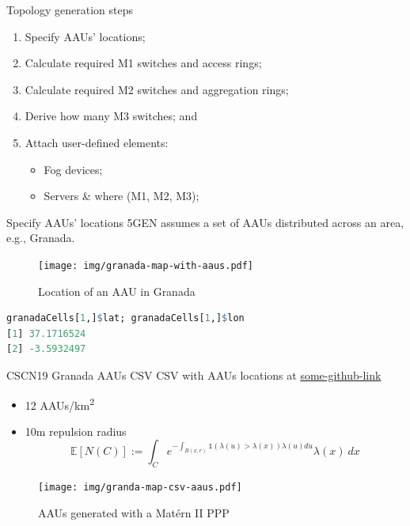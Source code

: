 \documentclass{beamer}
\begin{document}
\begin{frame}{Topology generation steps}
    \begin{enumerate}
        \item Specify AAUs' locations;
        \item Calculate required M1 switches and access rings;
        \item Calculate required M2 switches and aggregation rings;
        \item Derive how many M3 switches; and
        \item Attach user-defined elements:
            \begin{itemize}
                \item Fog devices;
                \item Servers \& where (M1, M2, M3);
            \end{itemize}
    \end{enumerate}
\end{frame}


\begin{frame}[fragile]{Specify AAUs' locations}
    5GEN assumes a set of AAUs distributed across an area, e.g., Granada.

    \begin{figure}
        \texttt{[image: img/granada-map-with-aaus.pdf]}
        \caption{Location of an AAU in Granada}
    \end{figure}


    \begin{lstlisting}[language=R]
granadaCells[1,]$lat; granadaCells[1,]$lon
[1] 37.1716524
[2] -3.5932497\end{lstlisting}
\end{frame}



\begin{frame}{CSCN19 Granada AAUs CSV}
    CSV with AAUs locations at \url{some-github-link}
    \begin{itemize}
        \item 12 AAUs/km\textsuperscript{2}
        \item 10m repulsion radius
        \begin{equation}
            \mathbb{E}\left[ N(C) \right] := \int_C e^{-\int_{B(x,r)} \mathds{1}\left(\lambda(u) > \lambda(x) \right) \lambda(u) du} \lambda(x)\ dx
            \label{eq:inh-matern2-avg}
        \end{equation}
    \end{itemize}

    \begin{figure}
        \texttt{[image: img/granda-map-csv-aaus.pdf]}
        \caption{AAUs generated with a Matérn II PPP \cite{repulsion}}
    \end{figure}
\end{frame}
\end{document}
